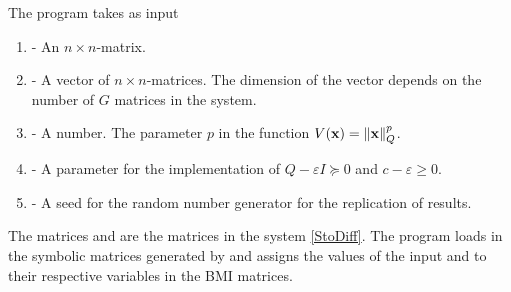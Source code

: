 \documentclass[a4paper,12pt,twoside,BCOR=10mm]{scrbook}
\begin{document}
The program  takes as input
\begin{enumerate}
    \item {} - An $n\times n$-matrix.
    \item {} - A vector of $n \times n$-matrices. The dimension of the vector depends on the number of $G$ matrices in the system.
    \item {} - A number. The parameter $p$ in the function $V(\mathbf{x}) = \left\lVert\mathbf{x}\right\rVert_Q^p$.
    \item {} - A parameter for the implementation of $Q - \varepsilon I \succeq 0$ and $c - \varepsilon \geq 0$.
    \item {} - A seed for the random number generator for the replication of results.
\end{enumerate}
The matrices  and  are the matrices in the system \eqref{StoDiff}. The program loads in the symbolic matrices generated by  and assigns the values of the input  and  to their respective variables in the BMI matrices.
\end{document}
